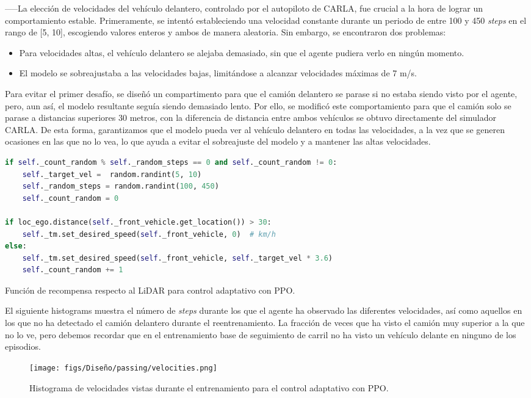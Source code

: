 -----La elección de velocidades del vehículo delantero, controlado por el autopiloto de CARLA, fue crucial a la hora de lograr un comportamiento estable. Primeramente, se intentó estableciendo una velocidad constante durante un periodo de entre 100 y 450 \textit{steps} en el rango de [5, 10], escogiendo valores enteros y ambos de manera aleatoria. Sin embargo, se encontraron dos problemas:
  \begin{itemize}
        \item Para velocidades altas, el vehículo delantero se alejaba demasiado, sin que el agente pudiera verlo en ningún momento.
        \item El modelo se sobreajustaba a las velocidades bajas, limitándose a alcanzar velocidades máximas de 7 m/s.
    \end{itemize}
Para evitar el primer desafío, se diseñó un compartimento para que el camión delantero se parase si no estaba siendo visto por el agente, pero, aun así, el modelo resultante seguía siendo demasiado lento. Por ello, se modificó este comportamiento para que el camión solo se parase a distancias superiores 30 metros, con la diferencia de distancia entre ambos vehículos se obtuvo directamente del simulador CARLA. De esta forma, garantizamos que el modelo pueda ver al vehículo delantero en todas las velocidades, a la vez que se generen ocasiones en las que no lo vea, lo que ayuda a evitar el sobreajuste del modelo y a mantener las altas velocidades.

\begin{code}[H]
\begin{lstlisting}[language=Python]
if self._count_random % self._random_steps == 0 and self._count_random != 0:
	self._target_vel =  random.randint(5, 10)
	self._random_steps = random.randint(100, 450)
	self._count_random = 0

if loc_ego.distance(self._front_vehicle.get_location()) > 30:
	self._tm.set_desired_speed(self._front_vehicle, 0)  # km/h
else:
	self._tm.set_desired_speed(self._front_vehicle, self._target_vel * 3.6)
	self._count_random += 1
\end{lstlisting}
\caption[Función de recompensa respecto al \ac{LiDAR} para el control adaptativo con \ac{PPO}]{Función de recompensa respecto al \ac{LiDAR} para control adaptativo con \ac{PPO}.}
\label{cod:rew_ppo_passing}
\end{code}

El siguiente histograms muestra el número de \textit{steps} durante los que el agente ha observado las diferentes velocidades, así como aquellos en los que no ha detectado el camión delantero durante el reentrenamiento. La fracción de veces que ha visto el camión muy superior a la que no lo ve, pero debemos recordar que en el entrenamiento base de seguimiento de carril no ha visto un vehículo delante en ninguno de los episodios.
\begin{figure}[ht]
  \centering
  \texttt{[image: figs/Diseño/passing/velocities.png]}
  \caption{Histograma de velocidades vistas durante el entrenamiento para el control adaptativo con \ac{PPO}.}
  \label{fig:velocities}
\end{figure}

